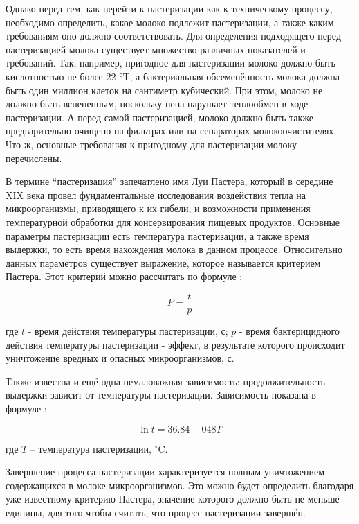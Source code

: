 Однако перед тем, как перейти к пастеризации как к техническому процессу, необходимо определить, какое молоко подлежит пастеризации, а также каким требованиям оно должно соответствовать. Для определения подходящего перед пастеризацией молока существует множество различных показателей и требований. Так, например, пригодное для пастеризации молоко должно быть кислотностью не более 22 °T, а бактериальная обсеменённость молока должна быть один миллион клеток на сантиметр кубический. При этом, молоко не должно быть вспененным, поскольку пена нарушает теплообмен в ходе пастеризации. А перед самой пастеризацией, молоко должно быть также предварительно очищено на фильтрах или на сепараторах-молокоочистителях. Что ж, основные требования к пригодному для пастеризации молоку перечислены.

В термине “пастеризация” запечатлено имя Луи Пастера, который в середине XIX века провел фундаментальные исследования воздействия тепла на микроорганизмы, приводящего к их гибели, и возможности применения температурной обработки для консервирования пищевых продуктов. Основные параметры пастеризации есть температура пастеризации, а также время выдержки, то есть время нахождения молока в данном процессе. Относительно данных параметров существует выражение, которое называется критерием Пастера. Этот критерий можно рассчитать по формуле \cite{ПереработкаМолока2003}:

\begin{equation}
    P=\frac{t}{p}
\end{equation}

где $t$ - время действия температуры пастеризации, с; $p$ - время бактерицидного действия температуры пастеризации - эффект, в результате которого происходит уничтожение вредных и опасных микроорганизмов, с.

Также известна и ещё одна немаловажная зависимость: продолжительность выдержки зависит от температуры пастеризации. Зависимость показана в формуле \cite{ПереработкаМолока2003}:

\begin{equation}
    \ln{t} = 36.84 - 048T
\end{equation}

где $T$ {--} температура пастеризации, $^{\circ}$C.

Завершение процесса пастеризации характеризуется полным уничтожением содержащихся в молоке микроорганизмов. Это можно будет определить благодаря уже известному критерию Пастера, значение которого должно быть не меньше единицы, для того чтобы считать, что процесс пастеризации завершён.

